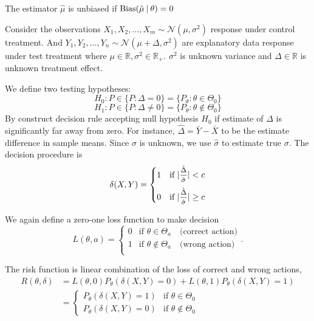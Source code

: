 \begin{definition}
    The estimator $\hat{\mu}$ is unbiased if $\operatorname*{Bias}(\hat{\mu} \> | \> \theta) = 0$
\end{definition}

\begin{example}
    Consider the observations $X_1, X_2, \ldots, X_m \sim \mathcal{N}(\mu, \sigma^2)$ response 
    under control treatment. And $Y_1, Y_2, \ldots, Y_n \sim \mathcal{N}(\mu + \Delta, \sigma^2)$
    are explanatory data response under test treatment where $\mu \in \mathbb{R}, \sigma^2 \in \mathbb{R}_+$.
    $\sigma^2$ is unknown variance and $\Delta \in \mathbb{R}$ is unknown treatment effect.

    We define two testing hypotheses:
    \[
        H_0 : P \in \{ P : \Delta = 0 \} = \{ P_\theta : \theta \in \Theta_0 \}
    \]
    \[
        H_1 : P \in \{ P : \Delta \neq 0 \} = \{ P_\theta : \theta \notin \Theta_0 \}
    \]
    By construct decision rule accepting null hypothesis $H_0$ if estimate of $\Delta$ 
    is significantly far away from zero. For instance, $\hat{\Delta} = \bar{Y} - \bar{X}$ to be 
    the estimate difference in sample means. Since $\sigma$ is unknown, we use $\hat{\sigma}$ to estimate 
    true $\sigma$. The decision procedure is 
    \[
        \delta(X,Y) = \begin{cases}
            1 & \text{if } |\mfrac{\hat{\Delta}}{\hat{\sigma}}| < c\\[0.8em]
            0 & \text{if } |\mfrac{\hat{\Delta}}{\hat{\sigma}}| \geq c
        \end{cases}
    \]

    We again define a zero-one loss function to make decision 
    \begin{equation*}
        L(\theta, a) = \begin{cases}
            0 & \text{if } \theta \in \Theta_a \quad \text{(correct action)}\\
            1 & \text{if } \theta \notin \Theta_a \quad \text{(wrong action)}\\
        \end{cases}.
    \end{equation*}

    The risk function is linear combination of the loss of correct and wrong actions,
    \begin{align*}
        R(\theta, \delta) &= L(\theta, 0)P_\theta \left(\delta(X,Y) = 0 \right) +
        L(\theta, 1)P_\theta \left(\delta(X,Y) = 1 \right)\\
        &= \begin{cases}
            P_\theta \left(\delta(X,Y) = 1 \right) & \text{if } \theta \in \Theta_0\\
            P_\theta \left(\delta(X,Y) = 0 \right) & \text{if } \theta \notin \Theta_0
        \end{cases}
    \end{align*}
\end{example}

